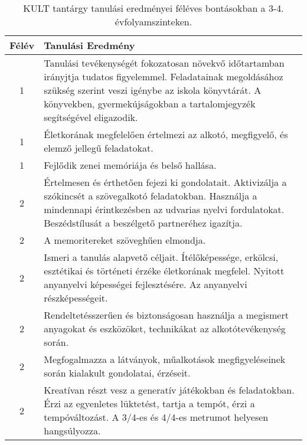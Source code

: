        
           \begin{longtable}{c | p{12cm} }
            \caption[KULT 3-4.]{KULT tantárgy tanulási eredményei féléves bontásokban a 3-4. évfolyamszinteken. }  \\

            \textbf{Félév} & \textbf{Tanulási Eredmény} \\
            \hline
            \endhead
                                
                                      
                                
                                          1 &  Tanulási tevékenységét fokozatosan növekvő időtartamban irányjtja tudatos figyelemmel. Feladatainak megoldásához szükség szerint veszi igénybe az iskola könyvtárát. A könyvekben, gyermekújságokban a tartalomjegyzék segítségével eligazodik. \\ \hline
                                          1 &  Életkorának megfelelően értelmezi az alkotó, megfigyelő, és elemző jellegű feladatokat. \\ \hline
                                          1 &  Fejlődik zenei memóriája és belső hallása. \\ \hline
                                      
                                
                                          2 &  Értelmesen és érthetően fejezi ki gondolatait. Aktivizálja a szókincsét a szövegalkotó feladatokban. Használja a mindennapi érintkezésben az udvarias nyelvi fordulatokat. Beszédstílusát a beszélgető partneréhez igazítja. \\ \hline
                                          2 &  A memoritereket szöveghűen elmondja. \\ \hline
                                          2 &  Ismeri a tanulás alapvető céljait. Ítélőképessége, erkölcsi, esztétikai és történeti érzéke életkorának megfelel. Nyitott anyanyelvi képességei fejlesztésére. Az anyanyelvi részképességeit. \\ \hline
                                          2 &  Rendeltetésszerűen és biztonságosan használja a megismert anyagokat és eszközöket, technikákat az alkotótevékenység során. \\ \hline
                                          2 &  Megfogalmazza a látványok, műalkotások megfigyeléseinek során kialakult gondolatai, érzéseit. \\ \hline
                                          2 &  Kreatívan részt vesz a generatív játékokban és feladatokban. Érzi az egyenletes lüktetést, tartja a tempót, érzi a tempóváltozást. A 3/4-es és 4/4-es metrumot helyesen hangsúlyozza. \\ \hline
                                      

\end{longtable}
